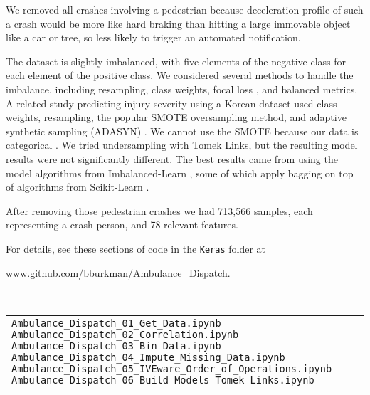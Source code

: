 We removed all crashes involving a pedestrian because deceleration profile of such a crash would be more like hard braking than hitting a large immovable object like a car or tree, so less likely to trigger an automated notification.  

The dataset is slightly imbalanced, with five elements of the negative class for each element of the positive class.  We considered several methods to handle the imbalance, including resampling, class weights, focal loss \citep{lin2017focal}, and balanced metrics. 
A related study predicting injury severity using a Korean dataset used class weights, resampling, the popular SMOTE oversampling method, and adaptive synthetic sampling (ADASYN) \citep{KONG2023106393}.  
 We cannot use the SMOTE because our data is categorical \citep{Chawla_2002}.  We tried undersampling with Tomek Links, but the resulting model results were not significantly different.  The best results came from using the model algorithms from Imbalanced-Learn \citep{Imblearn}, some of which apply bagging on top of algorithms from Scikit-Learn \citep{scikit-learn}.

After removing those pedestrian crashes we had 713,566 samples, each representing a crash person, and 78 relevant features.  






For details, see these sections of code in the {\tt Keras} folder at 

\url{www.github.com/bburkman/Ambulance_Dispatch}.

\

\begin{tabular}{l}
	\verb|Ambulance_Dispatch_01_Get_Data.ipynb| \cr
	\verb|Ambulance_Dispatch_02_Correlation.ipynb| \cr
	\verb|Ambulance_Dispatch_03_Bin_Data.ipynb| \cr
	\verb|Ambulance_Dispatch_04_Impute_Missing_Data.ipynb| \cr
	\verb|Ambulance_Dispatch_05_IVEware_Order_of_Operations.ipynb| \cr
	\verb|Ambulance_Dispatch_06_Build_Models_Tomek_Links.ipynb| \cr
\end{tabular}


